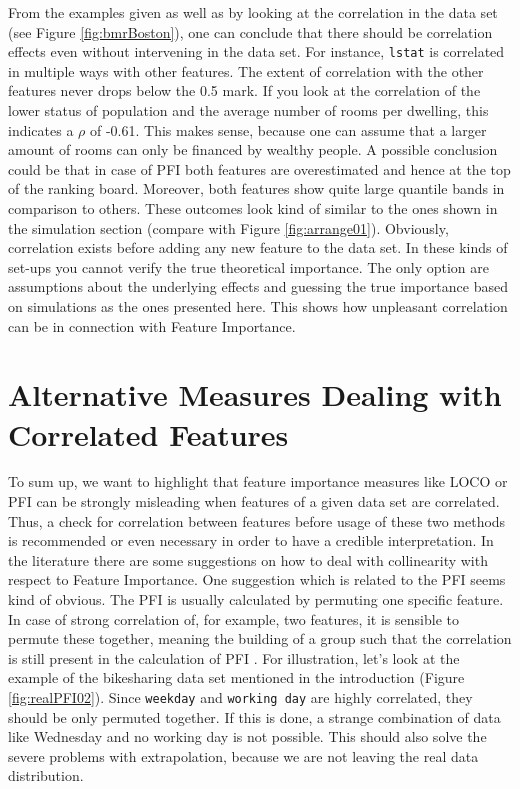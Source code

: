\documentclass[
]{krantz}
\begin{document}
From the examples given as well as by looking at the correlation in the data set (see Figure \ref{fig:bmrBoston}), one can conclude that there should be correlation effects even without intervening in the data set. For instance, \texttt{lstat} is correlated in multiple ways with other features. The extent of correlation with the other features never drops below the 0.5 mark. If you look at the correlation of the lower status of population and the average number of rooms per dwelling, this indicates a \(\rho\) of -0.61. This makes sense, because one can assume
that a larger amount of rooms can only be financed by wealthy people. A possible conclusion could be that in case of PFI both features are overestimated and hence at the top of the ranking board. Moreover, both features show quite large quantile bands in comparison to others. These outcomes look kind of similar to the ones shown in the simulation section (compare with Figure \ref{fig:arrange01}). Obviously, correlation exists before adding any new feature to the data set. In these kinds of set-ups you cannot verify the true theoretical importance. The only option are assumptions about the underlying effects and guessing the true importance based on simulations as the ones presented here. This shows how unpleasant correlation can be in connection with Feature Importance.

\hypertarget{alternative-measures-dealing-with-correlated-features}{%
\section{Alternative Measures Dealing with Correlated Features}\label{alternative-measures-dealing-with-correlated-features}}

To sum up, we want to highlight that feature importance measures like LOCO or PFI can be strongly misleading when features of a given data set are correlated. Thus, a check for correlation between features before usage of these two methods is recommended or even necessary in order to have a credible interpretation. In the literature there are some suggestions on how to deal with collinearity with respect to Feature Importance. One suggestion which is related to the PFI seems kind of obvious. The PFI is usually calculated by permuting one specific feature. In case of strong correlation of, for example, two features, it is sensible to permute these together, meaning the building of a group such that the correlation is still present in the calculation of PFI \citep{parr2018}. For illustration, let's look at the example of the bikesharing data set mentioned in the introduction (Figure \ref{fig:realPFI02}). Since \texttt{weekday} and \texttt{working\ day} are highly correlated, they should be only permuted together. If this is done, a strange combination of data like Wednesday and no working day is not possible. This should also solve the severe problems with extrapolation, because we are not leaving the real data distribution.
\end{document}
